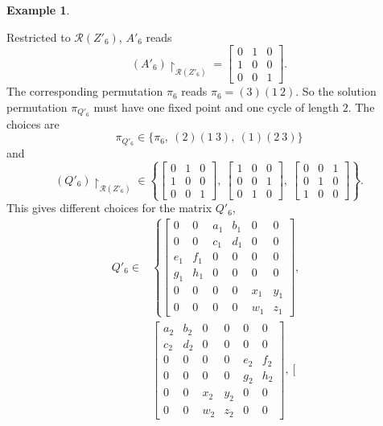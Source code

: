 \documentclass{article}
\theoremstyle{definition}\newtheorem{example}{Example}[section]
\def\R{{\mathcal{R}}}
\begin{document}
\begin{example}
\begin{itemize}
 			Restricted to $\R(Z'_6)$, $A'_6$ reads
 			$$\left(A'_6\right)\upharpoonright_{\R(Z'_6)}=\left[\begin{array}{ccc}
 				0 & 1 & 0\\
 				1 & 0 & 0 \\
 				0& 0 & 1\end{array}\right].$$
 				The corresponding permutation $\pi_6$ reads $\pi_6=(3)(1\ 2)$. So the solution permutation $\pi_{Q'_6}$ must have one fixed point and one cycle of length $2$. The choices are
 				$$\pi_{Q'_6}\in\{\pi_6,\ (2)(1\ 3), \ (1) (2\ 3)\}$$
 				and
 				$$\left(Q'_6\right)\upharpoonright_{\R(Z'_6)}\in\left\{\left[\begin{array}{ccc}
 					0 & 1 & 0\\
 					1 & 0 & 0 \\
 					0& 0 & 1\end{array}\right],\ \left[\begin{array}{ccc}
 					1 & 0 & 0\\
 					0 & 0 & 1 \\
 					0& 1 & 0\end{array}\right],\ \left[\begin{array}{ccc}
 					0 & 0 & 1\\
 					0 & 1 & 0 \\
 					1& 0 & 0\end{array}\right] \right\}.$$
 					This gives different choices for the matrix $Q'_6$, 
 					$$\begin{aligned}Q'_6\in&\left\{\left[\begin{array}{cccccc}
 						0 & 0 & a_1 & b_1 & 0 & 0\\0 & 0 & c_1 & d_1& 0 & 0\\ e_1 & f_1 & 0 & 0 &0 & 0\\g_1 & h_1 & 0 & 0& 0 & 0\\ 0 & 0 & 0 &0 & x_1 & y_1\\
 						0 & 0 & 0 & 0 & w_1 & z_1	\end{array}\right],\right.\\
 						&\left.\left[\begin{array}{cccccc}
 						a_2 & b_2 & 0 & 0 & 0 & 0\\c_2 & d_2 & 0 & 0& 0 & 0\\ 0 & 0 & 0 & 0 &e_2 & f_2\\0 & 0 & 0 & 0& g_2 & h_2\\ 0 & 0 & x_2 &y_2 & 0 & 0\\
 						0 & 0 & w_2 & z_2 & 0 & 0	\end{array}\right],\left[\begin{array}{cccccc}

\end{array}
\end{aligned}$$
\end{itemize}
\end{example}
\end{document}
